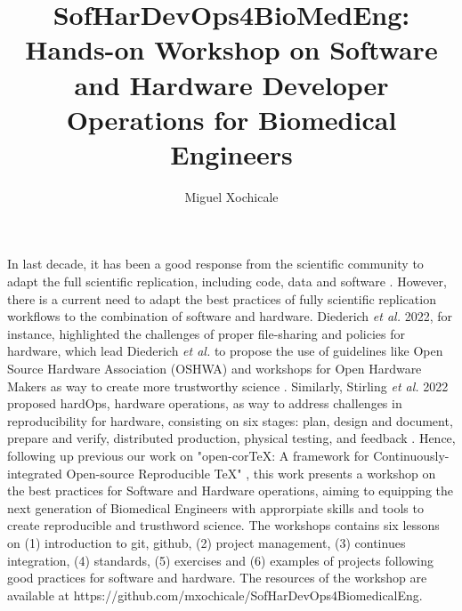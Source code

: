 \documentclass{article}
\title{
SofHarDevOps4BioMedEng: Hands-on Workshop on Software and Hardware Developer Operations for Biomedical Engineers 
}
\author{Miguel Xochicale}
\date{\DTMNow}
\begin{document}
\maketitle
In last decade, it has been a good response from the scientific community to adapt the full scientific replication, including code, data and software \cite{peng2011}. 
However, there is a current need to adapt the best practices of fully scientific replication workflows to the combination of software and hardware.
Diederich \textit{et al.} 2022, for instance, highlighted the challenges of proper file-sharing and policies for hardware, which lead Diederich \textit{et al.} to propose the use of guidelines like Open Source Hardware Association (OSHWA) and workshops for Open Hardware Makers as way to create more trustworthy science \cite{Diederich2022}.
Similarly, Stirling \textit{et al.} 2022 proposed hardOps, hardware operations, as way to address challenges in reproducibility for hardware, consisting on six stages: plan, design and document, prepare and verify, distributed production, physical testing, and feedback \cite{stirling2022}. 
Hence, following up previous our work on "open-corTeX: A framework for Continuously-integrated Open-source Reproducible TeX" \cite{xochicale2020}, this work presents a workshop on the best practices for Software and Hardware operations, aiming to equipping the next generation of Biomedical Engineers with approrpiate skills and tools to create reproducible and trusthword science.
The workshops contains six lessons on (1) introduction to git, github, (2) project management, (3) continues integration, (4) standards, (5) exercises and (6) examples of projects following good practices for software and hardware.
The resources of the workshop are available at https://github.com/mxochicale/SofHarDevOps4BiomedicalEng.

\newpage
%

\end{document}
